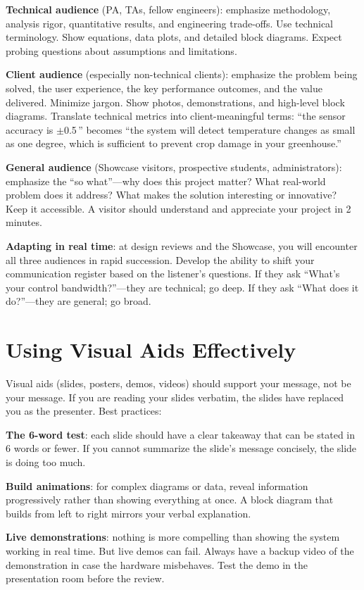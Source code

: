 \textbf{Technical audience} (PA, TAs, fellow engineers): emphasize methodology, analysis rigor, quantitative results, and engineering trade-offs. Use technical terminology. Show equations, data plots, and detailed block diagrams. Expect probing questions about assumptions and limitations.

\textbf{Client audience} (especially non-technical clients): emphasize the problem being solved, the user experience, the key performance outcomes, and the value delivered. Minimize jargon. Show photos, demonstrations, and high-level block diagrams. Translate technical metrics into client-meaningful terms: ``the sensor accuracy is $\pm$0.5\,\degC{}'' becomes ``the system will detect temperature changes as small as one degree, which is sufficient to prevent crop damage in your greenhouse.''

\textbf{General audience} (Showcase visitors, prospective students, administrators): emphasize the ``so what''---why does this project matter? What real-world problem does it address? What makes the solution interesting or innovative? Keep it accessible. A visitor should understand and appreciate your project in 2 minutes.

\textbf{Adapting in real time}: at design reviews and the Showcase, you will encounter all three audiences in rapid succession. Develop the ability to shift your communication register based on the listener's questions. If they ask ``What's your control bandwidth?''---they are technical; go deep. If they ask ``What does it do?''---they are general; go broad.

\section{Using Visual Aids Effectively}
Visual aids (slides, posters, demos, videos) should support your message, not be your message. If you are reading your slides verbatim, the slides have replaced you as the presenter. Best practices:

\textbf{The 6-word test}: each slide should have a clear takeaway that can be stated in 6 words or fewer. If you cannot summarize the slide's message concisely, the slide is doing too much.

\textbf{Build animations}: for complex diagrams or data, reveal information progressively rather than showing everything at once. A block diagram that builds from left to right mirrors your verbal explanation.

\textbf{Live demonstrations}: nothing is more compelling than showing the system working in real time. But live demos can fail. Always have a backup video of the demonstration in case the hardware misbehaves. Test the demo in the presentation room before the review.

